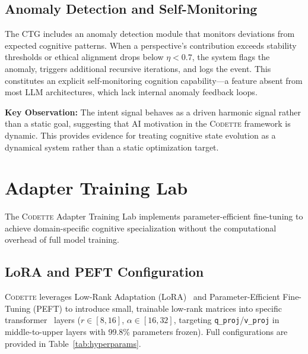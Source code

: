\documentclass[11pt,a4paper]{article}
\newcommand{\codette}{\textsc{Codette}}
\begin{document}
\subsection{Anomaly Detection and Self-Monitoring}
The CTG includes an anomaly detection module that monitors deviations from expected cognitive patterns. When a perspective's contribution exceeds stability thresholds or ethical alignment drops below $\eta < 0.7$, the system flags the anomaly, triggers additional recursive iterations, and logs the event. This constitutes an explicit self-monitoring cognition capability---a feature absent from most LLM architectures, which lack internal anomaly feedback loops.

\medskip
\noindent\textbf{Key Observation:} The intent signal behaves as a driven harmonic signal rather than a static goal, suggesting that AI motivation in the \codette{} framework is dynamic. This provides evidence for treating cognitive state evolution as a dynamical system rather than a static optimization target.

\section{Adapter Training Lab}
\label{sec:training}

The \codette{} Adapter Training Lab implements parameter-efficient fine-tuning to achieve domain-specific cognitive specialization without the computational overhead of full model training.

\subsection{LoRA and PEFT Configuration}
\codette{} leverages Low-Rank Adaptation (LoRA)~\citep{hu2021lora} and Parameter-Efficient Fine-Tuning (PEFT) to introduce small, trainable low-rank matrices into specific transformer~\citep{vaswani2017attention} layers ($r \in [8, 16]$, $\alpha \in [16, 32]$, targeting \texttt{q\_proj}/\texttt{v\_proj} in middle-to-upper layers with 99.8\% parameters frozen). Full configurations are provided in Table~\ref{tab:hyperparams}.
\end{document}
